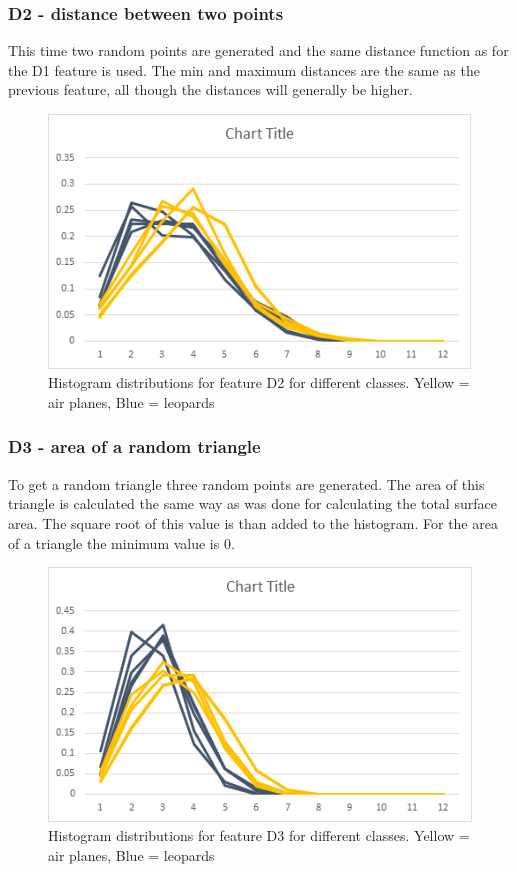 \documentclass{bigdata}
\begin{document}
\subsubsection{D2 - distance between two points}
This time two random points are generated and the same distance function as for the D1 feature is used. The min and maximum distances are the same as the previous feature, all though the distances will generally be higher.

\begin{figure}[h!]
    \includegraphics[width=\linewidth]{Pictures/Part3/D2.png}
    \caption{Histogram distributions for feature D2 for different classes. Yellow = air planes, Blue = leopards}
  \label{fig:eccentricity}
\end{figure}

\subsubsection{D3 - area of a random triangle}
To get a random triangle three random points are generated. The area of this triangle is calculated the same way as was done for calculating the total surface area. The square root of this value is than added to the histogram. 
For the area of a triangle the minimum value is 0.

\begin{figure}[h!]
    \includegraphics[width=\linewidth]{Pictures/Part3/D3.png}
    \caption{Histogram distributions for feature D3 for different classes. Yellow = air planes, Blue = leopards}
  \label{fig:eccentricity}
\end{figure}
\end{document}
